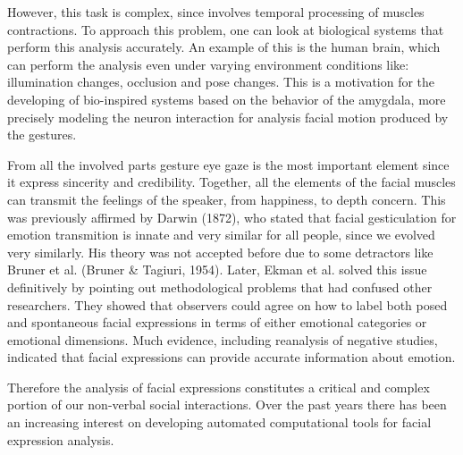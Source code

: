 However, this task is complex, since involves temporal processing of muscles contractions. To approach this problem, one can look at biological systems that perform this analysis accurately. An example of this is the human brain, which can perform the analysis even under varying environment conditions like: illumination changes, occlusion and pose changes. This is a motivation for the developing of bio-inspired systems based on the behavior of the amygdala, more precisely modeling the neuron interaction for analysis facial motion produced by the gestures.

From all the involved parts gesture eye gaze is the most important element since it express sincerity and credibility. Together, all the elements of the facial muscles can transmit the feelings of the speaker, from happiness, to depth concern. This was previously affirmed by Darwin (1872), who stated that facial gesticulation for emotion transmition is innate and very similar for all people, since we evolved very similarly. His theory was not accepted before due to some detractors like Bruner et al. (Bruner \& Tagiuri, 1954). Later, Ekman et al. \cite{Hager1979} solved this issue definitively by pointing out methodological problems that had confused other researchers. They showed that observers could agree on how to label both posed and spontaneous facial expressions in terms of either emotional categories or emotional dimensions. Much evidence, including reanalysis of negative studies, indicated that facial expressions can provide accurate information about emotion.

Therefore the analysis of facial expressions constitutes a critical and complex portion of our non-verbal social interactions. Over the past years there has been an increasing interest on developing automated computational tools for facial expression analysis.


